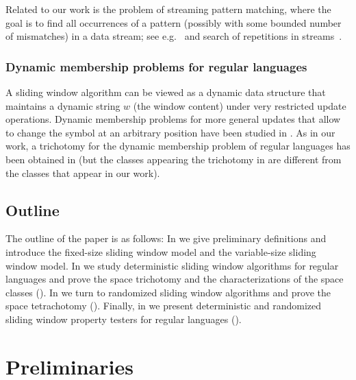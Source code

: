 \documentclass{theoretics}
\begin{document}
Related to our work is the problem of streaming pattern matching, where the goal is to find all occurrences of a pattern (possibly
with some bounded number of mismatches) in a data stream; see e.g.~\cite{DBLP:conf/focs/KociumakaPS21,DBLP:journals/iandc/RadoszewskiS20,DBLP:conf/cpm/GolanKKP20,DBLP:journals/algorithmica/GawrychowskiS22,BreslauerG14,CliffordFPSS15,CliffordFPSS16,CliffordKP19,CliffordS16,GolanKP16,GolanP17,GolanKP18,PoratP09,Starikovskaya17} and search of repetitions in streams~\cite{Ergun:10,stream-periodicity-mismatches,stream-periodicity-wildcards,DBLP:conf/cpm/GawrychowskiRS19,DBLP:journals/algorithmica/GawrychowskiMSU19,DBLP:conf/cpm/MerkurevS19,DBLP:conf/spire/MerkurevS19}.

\subsubsection{Dynamic membership problems for regular languages} 

A sliding window algorithm can be viewed as a dynamic data structure that
maintains a dynamic string $w$ (the window content) under very restricted update operations.
Dynamic membership problems for more general
updates that allow to change the symbol at an arbitrary position have been studied 
in \cite{AmarilliJP21,FrandsenHMRS95,FrandsenMS97}. As in our work, a trichotomy
for the dynamic membership problem of regular languages has been obtained in \cite{AmarilliJP21}
(but the classes appearing the trichotomy in \cite{AmarilliJP21} are different from the classes that
appear in our work).



\subsection{Outline}

The outline of the paper is as follows:
In  we give preliminary definitions
and introduce the fixed-size sliding window model
and the variable-size sliding window model.
In  we study deterministic sliding window algorithms
for regular languages and prove the space trichotomy
and the characterizations of the space classes ().
In  we turn to randomized sliding window algorithms and
prove the space tetrachotomy ().
Finally, in  we present deterministic and randomized
sliding window property testers for regular languages ().


\section{Preliminaries}
\end{document}
